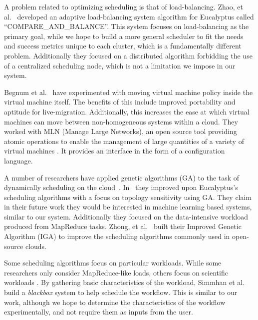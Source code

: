 A problem related to optimizing scheduling is that of load-balancing.  Zhao, et
al.~\cite{Zhao} developed an adaptive load-balancing system algorithm for
Eucalyptus called ``COMPARE\_AND\_BALANCE''.  This system focuses on
load-balancing as the primary goal, while we hope to build a more general
scheduler to fit the needs and success metrics unique to each cluster, which is
a fundamentally different problem.  Additionally they focused on a distributed
algorithm forbidding the use of a centralized scheduling node, which is not a
limitation we impose in our system.


Begnum et al.~\cite{Begnum} have experimented with moving virtual machine policy
inside the virtual machine itself.  The benefits of this include improved
portability and aptitude for live-migration.  Additionally, this increases the
ease at which virtual machines can move between non-homogeneous systems within a
cloud.  They worked with MLN (Manage Large Networks), an open source tool
providing atomic operations to enable the management of large quantities of a
variety of virtual machines \cite{Xen,UML,VMware}.  It provides an interface in
the form of a configuration language.


A number of researchers have applied genetic algorithms (GA) to the task of
dynamically scheduling on the cloud~\cite{Lee,Zhong,Chenhong}.  In~\cite{Lee}
they improved upon Eucalyptus's scheduling algorithms with a focus on topology
sensitivity using GA.  They claim in their future work they would be interested
in machine learning based systems, similar to our system.  Additionally they
focused on the data-intensive workload produced from MapReduce tasks. Zhong, et
al.~\cite{Zhong} built their Improved Genetic Algorithm (IGA) to improve the
scheduling algorithms commonly used in open-source clouds.


Some scheduling algorithms focus on particular workloads.  While some
researchers only consider MapReduce-like loads, others focus on scientific
workloads \cite{Juve,Simmhan,Hoffa}.  By gathering basic characteristics of the
workload, Simmhan et al.~\cite{Simmhan} build a \emph{blackbox} system to help
schedule the workflow.  This is similar to our work, although we hope to
determine the characteristics of the workflow experimentally, and not require
them as inputs from the user.
